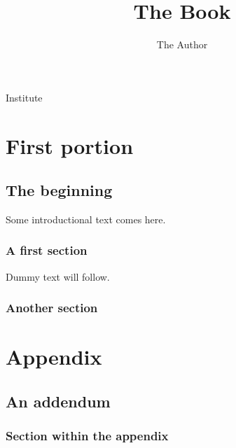 \documentclass[11pt,a5paper,pagesize=auto,titlepage=firstiscover]{scrbook}
\makeatletter
\renewcommand*{\maketitle}{
  \thispagestyle{empty}
  \vspace*{1cm}
  {\huge\raggedright\@title\par}
  \noindent\hrulefill\par
  {\LARGE\raggedleft\@author\par}
  \vfill
  {\Large\raggedleft Institute\par}
  \cleardoublepage
  }
\makeatother
\begin{document}
\title{The Book}
\author{The Author}
\date{}
\maketitle
{}
\tableofcontents 
\part{First portion}
\chapter{The beginning}
Some introductional text comes here.
\section{A first section}
Dummy text will follow.
\blindtext
\section{Another section}
\Blindtext
\appendix
\part{Appendix}
\chapter{An addendum}
\section{Section within the appendix}
\blindtext
\end{document}
